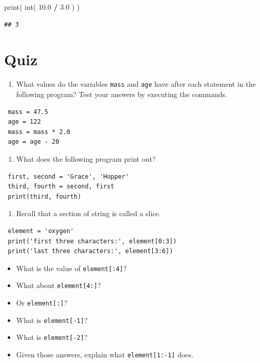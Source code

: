 \documentclass[]{book}
\newenvironment{Shaded}{\begin{snugshade}}{\end{snugshade}}
\newcommand{\BuiltInTok}[1]{#1}
\newcommand{\FloatTok}[1]{\textcolor[rgb]{0.00,0.00,0.81}{#1}}
\newcommand{\NormalTok}[1]{#1}
\newcommand{\OperatorTok}[1]{\textcolor[rgb]{0.81,0.36,0.00}{\textbf{#1}}}
\providecommand{\tightlist}{%
  \setlength{\itemsep}{0pt}\setlength{\parskip}{0pt}}
\theoremstyle{definition}
\theoremstyle{definition}
\theoremstyle{definition}
\theoremstyle{remark}
\begin{document}
\begin{Shaded}
\begin{Highlighting}[]
\BuiltInTok{print}\NormalTok{( }\BuiltInTok{int}\NormalTok{( }\FloatTok{10.0} \OperatorTok{/} \FloatTok{3.0}\NormalTok{ ) )}
\end{Highlighting}
\end{Shaded}

\begin{verbatim}
## 3
\end{verbatim}

\hypertarget{quiz}{%
\section{Quiz}\label{quiz}}

\begin{enumerate}
\def\labelenumi{\arabic{enumi}.}
\tightlist
\item
  What values do the variables \texttt{mass} and \texttt{age} have after
  each statement in the following program? Test your answers by
  executing the commands.
\end{enumerate}

\begin{verbatim}
 mass = 47.5
 age = 122
 mass = mass * 2.0
 age = age - 20
\end{verbatim}

\begin{enumerate}
\def\labelenumi{\arabic{enumi}.}
\setcounter{enumi}{1}
\tightlist
\item
  What does the following program print out?
\end{enumerate}

\begin{verbatim}
 first, second = 'Grace', 'Hopper'
 third, fourth = second, first
 print(third, fourth)
\end{verbatim}

\begin{enumerate}
\def\labelenumi{\arabic{enumi}.}
\setcounter{enumi}{2}
\tightlist
\item
  Recall that a section of string is called a slice.
\end{enumerate}

\begin{verbatim}
 element = 'oxygen'
 print('first three characters:', element[0:3])
 print('last three characters:', element[3:6])
\end{verbatim}

\begin{itemize}
\tightlist
\item
  What is the value of \texttt{element{[}:4{]}}?
\item
  What about \texttt{element{[}4:{]}}?
\item
  Or \texttt{element{[}:{]}}?
\item
  What is \texttt{element{[}-1{]}}?
\item
  What is \texttt{element{[}-2{]}}?
\item
  Given those answers, explain what \texttt{element{[}1:-1{]}} does.
\end{itemize}
\end{document}
